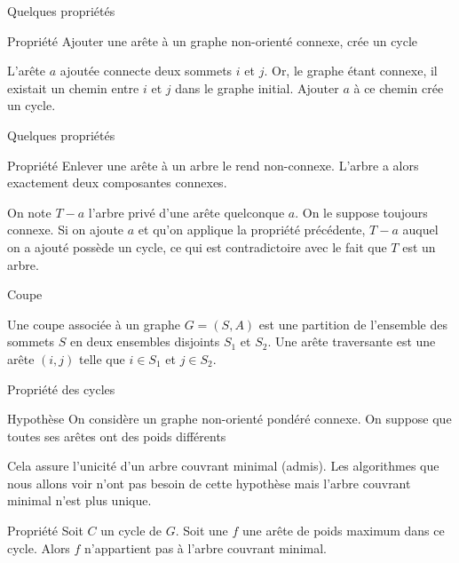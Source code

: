 \begin{frame}{Quelques propriétés}
    \begin{block}{Propriété}
        Ajouter une arête à un graphe non-orienté connexe, crée un cycle
    \end{block}
    L'arête $a$ ajoutée connecte deux sommets $i$ et $j$. Or, le graphe étant connexe, il existait un chemin entre $i$ et $j$ dans le graphe initial. Ajouter $a$ à ce chemin crée un cycle.  
\end{frame}

\begin{frame}{Quelques propriétés}
    \begin{block}{Propriété}
        Enlever une arête à un arbre le rend non-connexe. L'arbre a alors exactement deux composantes connexes. 
    \end{block}
    On note $T-a$ l'arbre privé d'une arête quelconque $a$. On le suppose toujours connexe. Si on ajoute $a$ et qu'on applique la propriété précédente, $T-a$ auquel on a ajouté possède un cycle, ce qui est contradictoire avec le fait que $T$ est un arbre. 
\end{frame}

\begin{frame}{Coupe}
    \begin{definition}
        Une coupe associée à un graphe $G=(S,A)$ est une partition de l'ensemble des sommets $S$ en deux ensembles disjoints $S_1$ et $S_2$. Une arête traversante est une arête $(i,j)$ telle que $i \in S_1$ et $j \in S_2$. 
    \end{definition}
\end{frame}

\begin{frame}{Propriété des cycles}

    \begin{block}{Hypothèse}
        On considère un graphe non-orienté pondéré connexe. On suppose que toutes ses arêtes ont des poids différents
    \end{block}

    Cela assure l'unicité d'un arbre couvrant minimal (admis). Les algorithmes que nous allons voir n'ont pas besoin de cette hypothèse mais l'arbre couvrant minimal n'est plus unique. 
    
    \begin{block}{Propriété}
        Soit $C$ un cycle de $G$. Soit une $f$ une arête de poids maximum dans ce cycle. Alors $f$ n'appartient pas à l'arbre couvrant minimal.
    \end{block}

\end{frame}

